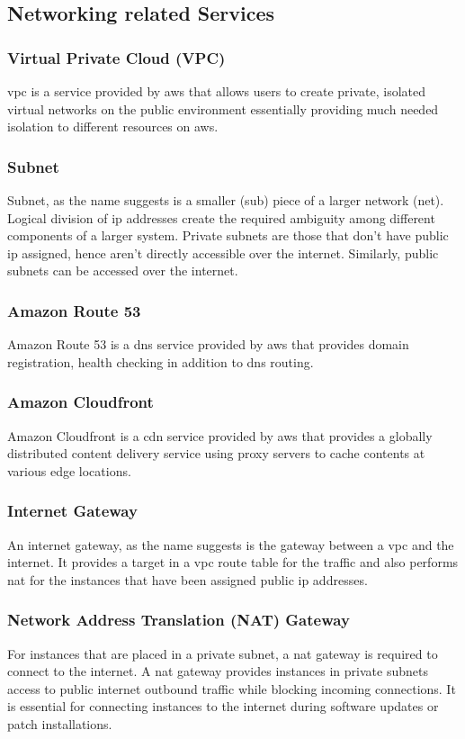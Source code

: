\documentclass{home_assignment}
\begin{document}
\subsection{Networking related Services}
    \subsubsection{Virtual Private Cloud (VPC)}
    \acrfull{vpc} is a service provided by \acrshort{aws} that allows users to create private, isolated virtual networks on the public environment essentially providing much needed isolation to different resources on \acrshort{aws}.
    \subsubsection{Subnet}
    Subnet, as the name suggests is a smaller (sub) piece of a larger network (net). Logical division of \acrshort{ip} addresses create the required ambiguity among different components of a larger system. Private subnets are those that don't have public \acrshort{ip} assigned, hence aren't directly accessible over the internet. Similarly, public subnets can be accessed over the internet.
    \subsubsection{Amazon Route 53}
    Amazon Route 53 is a \acrfull{dns} service provided by \acrshort{aws} that provides domain registration, health checking in addition to \acrshort{dns} routing.
    \subsubsection{Amazon Cloudfront}
    Amazon Cloudfront is a \acrfull{cdn} service provided by \acrshort{aws} that provides a globally distributed content delivery service using proxy servers to cache contents at various edge locations.
    \subsubsection{Internet Gateway}
    An internet gateway, as the name suggests is the gateway between a \acrshort{vpc} and the internet. It provides a target in a \acrshort{vpc} route table for the traffic and also performs \acrfull{nat} for the instances that have been assigned public \acrshort{ip} addresses. 
   \subsubsection{Network Address Translation (NAT) Gateway}
  For instances that are placed in a private subnet, a \acrfull{nat} gateway is required to connect to the internet. A \acrshort{nat} gateway provides instances in private subnets access to public internet outbound traffic while blocking incoming connections. It is essential for connecting instances to the internet during software updates or patch installations.
\end{document}
